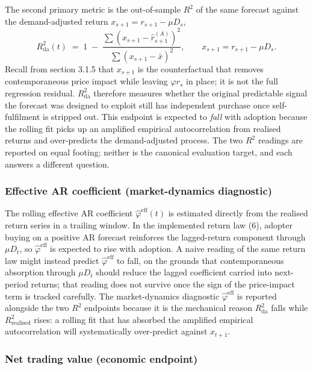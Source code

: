 \documentclass[11pt]{article}
\begin{document}
The second primary metric is the out-of-sample $R^{2}$ of the same forecast against the demand-adjusted return $x_{s+1} = r_{s+1} - \mu D_{s}$,
\begin{equation*}
  R^{2}_{\mathrm{da}}(t) \;=\; 1 \;-\; \frac{\sum (x_{s+1} - \hat{r}^{(A)}_{s+1})^{2}}{\sum (x_{s+1} - \bar{x})^{2}}, \qquad x_{s+1} = r_{s+1} - \mu D_{s}.
\end{equation*}
Recall from section 3.1.5 that $x_{s+1}$ is the counterfactual that removes contemporaneous price impact while leaving $\varphi r_{s}$ in place; it is not the full regression residual. $R^{2}_{\mathrm{da}}$ therefore measures whether the original predictable signal the forecast was designed to exploit still has independent purchase once self-fulfilment is stripped out. This endpoint is expected to \emph{fall} with adoption because the rolling fit picks up an amplified empirical autocorrelation from realised returns and over-predicts the demand-adjusted process. The two $R^{2}$ readings are reported on equal footing; neither is the canonical evaluation target, and each answers a different question.

\subsubsection{Effective AR coefficient (market-dynamics diagnostic)}

The rolling effective AR coefficient $\hat{\varphi}^{\mathrm{eff}}(t)$ is estimated directly from the realised return series in a trailing window. In the implemented return law (6), adopter buying on a positive AR forecast reinforces the lagged-return component through $\mu D_t$, so $\hat{\varphi}^{\mathrm{eff}}$ is expected to rise with adoption. A naive reading of the same return law might instead predict $\hat{\varphi}^{\mathrm{eff}}$ to fall, on the grounds that contemporaneous absorption through $\mu D_t$ should reduce the lagged coefficient carried into next-period returns; that reading does not survive once the sign of the price-impact term is tracked carefully. The market-dynamics diagnostic $\hat{\varphi}^{\mathrm{eff}}$ is reported alongside the two $R^{2}$ endpoints because it is the mechanical reason $R^{2}_{\mathrm{da}}$ falls while $R^{2}_{\mathrm{realised}}$ rises: a rolling fit that has absorbed the amplified empirical autocorrelation will systematically over-predict against $x_{t+1}$.

\subsubsection{Net trading value (economic endpoint)}
\end{document}
